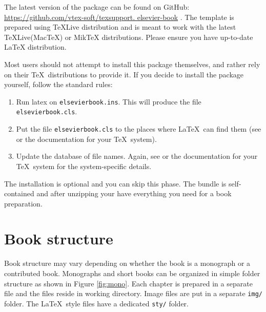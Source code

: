 \documentclass{ltxdoc}
\def\file#1{\texttt{#1}}
\begin{document}
The latest version of the package can be found on GitHub:
 \url{https://github.com/vtex-soft/texsupport. elsevier-book}%
. 
The template is prepared using TeXLive distribution  and
is meant to work with the latest TeXLive(MacTeX) \cite{ref:texlive} or MikTeX \cite{ref:miktex} distributions. Please ensure you have up-to-date
LaTeX distribution.



Most users should not attempt to install this package themselves, and rather rely on
their \TeX\ distributions to provide it. If you decide to install the package yourself, follow
the standard rules:
\begin{enumerate}
\item Run latex on \file{elsevierbook.ins}. This will produce the file \file{elsevierbook.cls}.
\item Put the file \file{elsevierbook.cls}  to the places where \LaTeX\ 
can find them (see \cite{ref:ukfaq} or the documentation for your \TeX\ system).
\item Update the database of file names. Again, see \cite{ref:ukfaq} or the documentation for your
\TeX\ system for the system-specific details.
\end{enumerate}


The installation is optional and you can skip this phase.
The bundle is self-contained and after unzipping your have everything you need for a book preparation. 





\section{Book structure}\label{bookstructure}

Book structure may vary depending on whether the book is a monograph or a contributed book. 
Monographs and short books can be organized in simple folder structure as shown in Figure 
\ref{fig:mono}.
Each chapter is prepared in a separate file and the files reside in working directory. 
Image files are put in a separate \file{img/} folder. 
The \LaTeX\ style files have a dedicated \file{sty/} folder.
\end{document}
